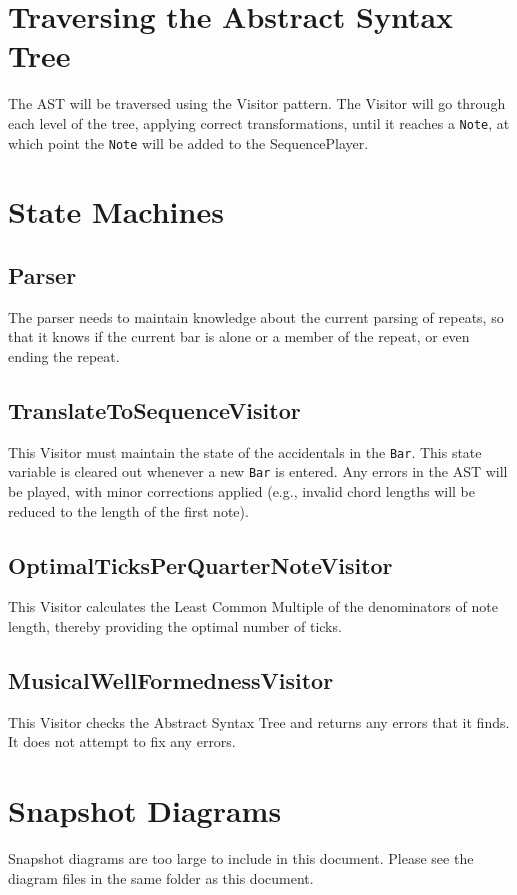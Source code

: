 \documentclass[12pt]{article}
\begin{document}
\section{Traversing the Abstract Syntax Tree}
The AST will be traversed using the Visitor pattern. The Visitor will
go through each level of the tree, applying correct transformations,
until it reaches a \texttt{Note}, at which point the \texttt{Note}
will be added to the SequencePlayer.

\section{State Machines}
\subsection{Parser}
The parser needs to maintain knowledge about the current parsing of
repeats, so that it knows if the current bar is alone or a member of
the repeat, or even ending the repeat.

\subsection{TranslateToSequenceVisitor}
This Visitor must maintain the state of the accidentals in the
\texttt{Bar}. This state variable is cleared out whenever a new
\texttt{Bar} is entered. Any errors in the AST will be played, with
minor corrections applied (e.g., invalid chord lengths will be reduced
to the length of the first note).

\subsection{OptimalTicksPerQuarterNoteVisitor}
This Visitor calculates the Least Common Multiple of the denominators
of note length, thereby providing the optimal number of ticks.

\subsection{MusicalWellFormednessVisitor}
This Visitor checks the Abstract Syntax Tree and returns any errors
that it finds. It does not attempt to fix any errors.

\section{Snapshot Diagrams}
Snapshot diagrams are too large to include in this document. Please
see the diagram files in the same folder as this document.
\end{document}
